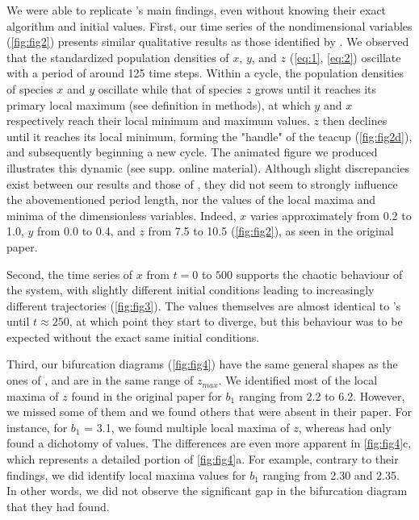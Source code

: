We were able to replicate \citeauthor{hastings1991}'s main findings, even without knowing their
exact algorithm and initial values.
First, our time series of the nondimensional variables (\autoref{fig:fig2}) presents similar
qualitative results as those identified by \citeauthor{hastings1991}.
We observed that the standardized population densities of $x$, $y$, and $z$ (\autoref{eq:1}, \autoref{eq:2})
oscillate with a period of around 125 time steps.
Within a cycle, the population densities of species $x$ and $y$ oscillate while that of
species $z$ grows until it reaches its primary local maximum (see definition in methods),
at which $y$ and $x$ respectively reach their local minimum and maximum values.
$z$ then declines until it reaches its local minimum, forming the "handle" of the teacup
(\autoref{fig:fig2d}), and subsequently beginning a new cycle.
The animated figure we produced illustrates this dynamic (see supp.
online material).
Although slight discrepancies exist between our results and those of \citeauthor{hastings1991},
they did not seem to strongly influence the abovementioned period length, nor the values
of the local maxima and minima of the dimensionless variables.
Indeed, $x$ varies approximately from 0.2 to 1.0, $y$ from 0.0 to 0.4, and $z$ from 7.5 to
10.5 (\autoref{fig:fig2}), as seen in the original paper.

Second, the time series of $x$ from $t = 0$ to $500$ supports the chaotic behaviour of the
system, with slightly different initial conditions leading to increasingly different
trajectories (\autoref{fig:fig3}). The values themselves are almost identical to \citeauthor{hastings1991}'s
until $t \approx 250$, at which point they start to diverge, but this behaviour was to be
expected without the exact same initial conditions.

Third, our bifurcation diagrams (\autoref{fig:fig4}) have the same general shapes as the ones of
\citeauthor{hastings1991}, and are in the same range of $z_{max}$. We identified most of the
local maxima of $z$ found in the original paper for $b_1$ ranging from 2.2 to 6.2.
However, we missed some of them and we found others that were absent in their paper.
For instance, for $b_1$ = 3.1, we found multiple local maxima of $z$, whereas \citeauthor{hastings1991} had only found a dichotomy of values.
The differences are even more apparent in \autoref{fig:fig4}c, which represents a detailed
portion of \autoref{fig:fig4}a. For example, contrary to their findings, we did identify local
maxima values for $b_1$ ranging from 2.30 and 2.35. In other words, we did not observe the
significant gap in the bifurcation diagram that they had found.

